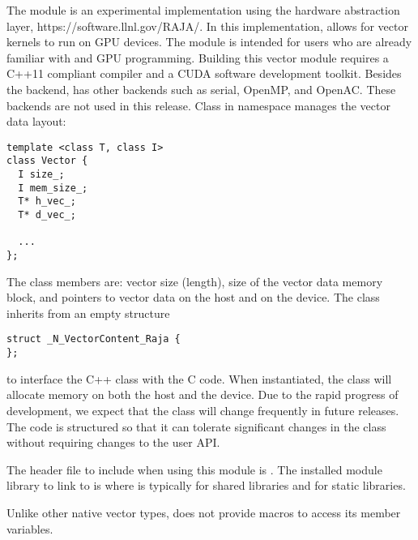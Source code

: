 %
The {\nvecraja} module is an experimental {\nvector} implementation using the {\raja} 
hardware abstraction layer, https://software.llnl.gov/RAJA/. In this implementation, {\raja}
allows for {\sundials} vector kernels to run on GPU devices. The module is intended for users 
who are already familiar with {\raja} and GPU programming. Building this vector 
module requires a C++11 compliant compiler and a CUDA software development toolkit. 
Besides the {\cuda} backend, {\raja} has other backends such as serial, OpenMP, 
and OpenAC. These backends are not used in this {\sundials} release.
Class  in namespace  manages the vector data layout:
\begin{verbatim} 
template <class T, class I>
class Vector {
  I size_;
  I mem_size_;
  T* h_vec_;
  T* d_vec_;
  
  ...
};
\end{verbatim}
The class members are: vector size (length), size of the vector data memory block, 
and pointers to vector data on the host and on the device. The class 
inherits from an empty structure
\begin{verbatim} 
struct _N_VectorContent_Raja {
};
\end{verbatim}
to interface the C++ class with the {\nvector} C code. When instantiated, the class
 will allocate memory on both the host and the device. Due to the rapid
progress of {\raja} development, we expect that the 
class will change frequently in future {\sundials} releases. The code is
structured so that it can tolerate significant changes in the 
 class without requiring changes to the user API.


The header file to include when using this module is .
The installed module library to link to is
where  is typically  for shared libraries
and  for static libraries.

Unlike other native {\sundials} vector types, {\nvecraja} does not provide macros 
to access its member variables.


